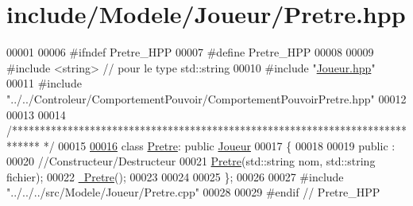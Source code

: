 \hypertarget{_pretre_8hpp_source}{\section{include/\-Modele/\-Joueur/\-Pretre.hpp}
}

\begin{DoxyCode}
00001 
00006 \textcolor{preprocessor}{#ifndef Pretre\_HPP}
00007 \textcolor{preprocessor}{}\textcolor{preprocessor}{#define Pretre\_HPP}
00008 \textcolor{preprocessor}{}
00009 \textcolor{preprocessor}{#include <string>} \textcolor{comment}{// pour le type std::string}
00010 \textcolor{preprocessor}{#include "\hyperlink{_joueur_8hpp}{Joueur.hpp}"}
00011 \textcolor{preprocessor}{#include "../../Controleur/ComportementPouvoir/ComportementPouvoirPretre.hpp"}
00012 
00013 
00014 \textcolor{comment}{/*****************************************************************************
      */}
00015 
\hypertarget{_pretre_8hpp_source_l00016}{}\hyperlink{class_pretre}{00016} \textcolor{keyword}{class }\hyperlink{class_pretre}{Pretre}: \textcolor{keyword}{public} \hyperlink{class_joueur}{Joueur}
00017 \{   
00018 
00019    \textcolor{keyword}{public} :
00020       \textcolor{comment}{//Constructeur/Destructeur}
00021       \hyperlink{class_pretre_a05462a17df09bcc3c84cebdcb994b9a5}{Pretre}(std::string nom, std::string fichier);
00022       \hyperlink{class_pretre_a9235b9c5f1c57e7d6bb8cba648c43414}{~Pretre}();
00023    
00024   
00025 \};
00026 
00027 \textcolor{preprocessor}{#include "../../../src/Modele/Joueur/Pretre.cpp"}
00028 
00029 \textcolor{preprocessor}{#endif // Pretre\_HPP}
\end{DoxyCode}
